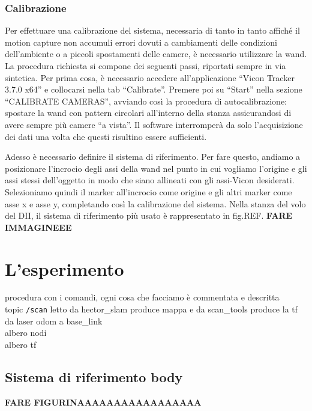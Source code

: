 \subsubsection*{Calibrazione}
Per effettuare una calibrazione del sistema, necessaria di tanto in tanto affiché il motion capture non accumuli errori dovuti a cambiamenti delle condizioni dell'ambiente o a piccoli spostamenti delle camere, è necessario utilizzare la wand. 
La procedura richiesta si compone dei seguenti passi, riportati sempre in via sintetica. Per prima cosa, è necessario accedere all'applicazione ``Vicon Tracker 3.7.0 x64'' e collocarsi nella tab ``Calibrate''. 
Premere poi su ``Start'' nella sezione ``CALIBRATE CAMERAS'', avviando così la procedura di autocalibrazione: spostare la wand con pattern circolari all'interno della stanza assicurandosi di avere sempre più camere ``a vista''. 
Il software interromperà da solo l'acquisizione dei dati una volta che questi risultino essere sufficienti.

Adesso è necessario definire il sistema di riferimento. Per fare questo, andiamo a posizionare l'incrocio degli assi della wand nel punto in cui vogliamo l'origine e gli assi stessi dell'oggetto in modo che siano allineati con gli assi-Vicon desiderati.
Selezioniamo quindi il marker all'incrocio come origine e gli altri marker come asse x e asse y, completando così la calibrazione del sistema. 
Nella stanza del volo del DII, il sistema di riferimento più usato è rappresentato in fig.REF.
\textbf{FARE IMMAGINEEE}


\newpage
\section{L'esperimento}
\label{sez:L'esperimento}
procedura con i comandi, ogni cosa che facciamo \`e commentata e descritta \\
topic \texttt{/scan} letto da hector\_slam produce mappa e da scan\_tools produce la tf da laser odom a base\_link \\
albero nodi\\
albero tf\\

\subsection{Sistema di riferimento body}
\textbf{FARE FIGURINAAAAAAAAAAAAAAAAA}

